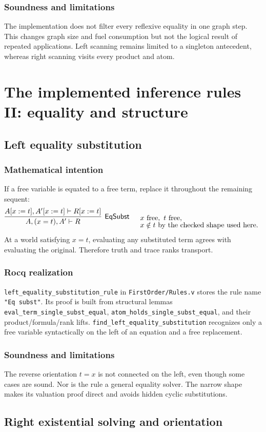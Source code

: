 \documentclass[11pt,oneside]{book}
\DeclareRobustCommand{\code}[1]{\nolinkurl{#1}}
\DeclareRobustCommand{\file}[1]{\nolinkurl{#1}}
\newcommand{\src}[2]{\code{#2} in \file{#1}}
\newcommand{\mathintent}{\subsection*{Mathematical intention}}
\newcommand{\rocqreal}{\subsection*{Rocq realization}}
\newcommand{\soundlim}{\subsection*{Soundness and limitations}}
\begin{document}
\soundlim

The implementation does not filter every reflexive equality in one graph
step.  This changes graph size and fuel consumption but not the logical result
of repeated applications.  Left scanning remains limited to a singleton
antecedent, whereas right scanning visits every product and atom.

\chapter{The implemented inference rules II: equality and structure}
\label{ch:rules-equality}

\section{Left equality substitution}

\mathintent

If a free variable is equated to a free term, replace it throughout the
remaining sequent:
\[
 \infer[\mathsf{EqSubst}]
       {A,(x=t),A'\vdash R}
       {A[x:=t],A'[x:=t]\vdash R[x:=t]}
 \quad
 \begin{array}{l}
 x\text{ free},\ t\text{ free},\\[-0.2em]
 x\notin t\text{ by the checked shape used here.}
 \end{array}
\]
At a world satisfying \(x=t\), evaluating any substituted term agrees with
evaluating the original.  Therefore truth and trace ranks transport.

\rocqreal

\src{FirstOrder/Rules.v}{left_equality_substitution_rule} stores the rule name
\code{"Eq subst"}.  Its proof is built from structural lemmas
\code{eval_term_single_subst_equal},
\code{atom_holds_single_subst_equal}, and their product/formula/rank lifts.
\code{find_left_equality_substitution} recognizes only a free variable
syntactically on the left of an equation and a free replacement.

\soundlim

The reverse orientation \(t=x\) is not connected on the left, even though
some cases are sound.  Nor is the rule a general equality solver.  The narrow
shape makes its valuation proof direct and avoids hidden cyclic substitutions.

\section{Right existential solving and orientation}
\end{document}
